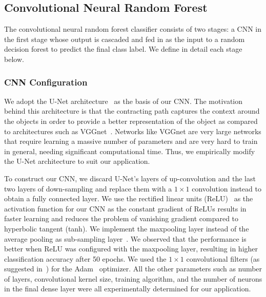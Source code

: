 \subsection{Convolutional Neural Random Forest}
The convolutional neural random forest classifier consists of two stages: a CNN in the first stage whose output is cascaded and fed in as the input to a random decision forest to predict the final class label. We define in detail each stage below.

\subsubsection{\textbf{CNN Configuration}}
We adopt the U-Net architecture~\cite{ronneberger_UNet_2015} as the basis of our CNN\@. The motivation behind this architecture is that the contracting path captures the context around the objects in order to provide a better representation of the object as compared to architectures such as VGGnet~\cite{simonyan_Very_2014}. Networks like VGGnet are very large networks that require learning a massive number of parameters and are very hard to train in general, needing significant computational time. Thus, we empirically modify the U-Net architecture to suit our application.

To construct our CNN, we discard U-Net's layers of up-convolution and the last two layers of down-sampling and replace them with a $1 \times 1$ convolution instead to obtain a fully connected layer. We use the rectified linear units (ReLU)~\cite{ronneberger_UNet_2015} as the activation function for our CNN as the constant gradient of ReLUs results in faster learning and reduces the problem of vanishing gradient compared to hyperbolic tangent (tanh). We implement the maxpooling layer instead of the average pooling as sub-sampling layer~\cite{krizhevsky_Imagenet_2017}. We observed that the performance is better when ReLU was configured with the maxpooling layer, resulting in higher classification accuracy after 50 epochs. We used the $1 \times 1$ convolutional filters (as suggested in~\cite{gupta_Convolutional_2017}) for the Adam~\cite{kingma_Variational_2015} optimizer. All the other parameters such as number of layers, convolutional kernel size, training algorithm, and the number of neurons in the final dense layer were all experimentally determined for our application.

